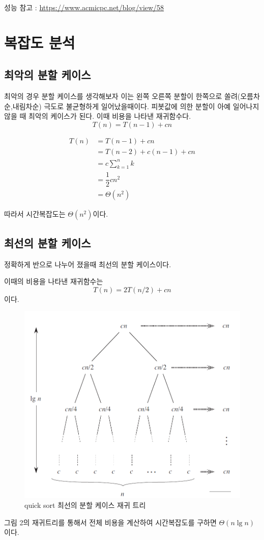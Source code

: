 \documentclass{oblivoir}
\begin{document}
성능 참고 : 
\url{https://www.acmicpc.net/blog/view/58}



\section{복잡도 분석}

\subsection{최악의 분할 케이스} 

최악의 경우 분할 케이스를 생각해보자 
이는 왼쪽 오른쪽 분할이 한쪽으로 쏠려(오름차순,내림차순) 극도로 불균형하게 일어났을때이다.
피봇값에 의한 분할이 아예 일어나지 않을 때 최악의 케이스가 된다.
이때 비용을 나타낸 재귀함수다.
$$T(n) = T(n-1) + cn $$

\begin{align*}
    T(n) &= T(n-1) + cn \\
    &= T(n-2) + c(n-1) +cn \\
    &= c\sum^{n}_{k=1}k \\
    &= \dfrac{1}{2} cn^{2}\\
    &= \Theta (n^{2})    
\end{align*}


따라서 시간복잡도는 $\Theta(n^2)$이다.

\subsection{최선의 분할 케이스} 

정확하게 반으로 나누어 졌을때 최선의 분할 케이스이다.

이때의 비용을 나타낸 재귀함수는
$$T(n) = 2T(n/2) + cn$$
이다.

\begin{figure}[h!]
    \centering
    \includegraphics[scale=0.5]{q2.png}
    \caption{quick sort 최선의 분할 케이스 재귀 트리}
\end{figure}
그림 2의 재귀트리를 통해서 전체 비용을 계산하여 시간복잡도를 구하면 $\Theta(n \lg n)$이다.
\end{document}
